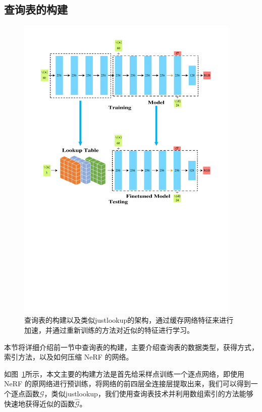 \subsection{查询表的构建}
\begin{figure}[t]
    \centering
    \includegraphics[width=0.95\textwidth]{figures/lookuptable.pdf}
    \caption{查询表的构建以及类似justlookup\cite{lin2019justlookup}的架构，通过缓存网络特征来进行加速，并通过重新训练的方法对近似的特征进行学习。}
    \label{fig:lookuptable}
\end{figure}

本节将详细介绍前一节中查询表的构建，主要介绍查询表的数据类型，获得方式，索引方法，以及如何压缩 NeRF 的网络。

如图~\ref{fig:lookuptable}所示，本文主要的构建方法是首先给采样点训练一个逐点网络，即使用 NeRF 的原网络进行预训练，将网络的前四层全连接层提取出来，我们可以得到一个逐点函数$\mathcal{G}$，类似justlookup\cite{lin2019justlookup}，我们使用查询表技术并利用数组索引的方法能够快速地获得近似的函数$\hat{\mathcal{G}}$。

